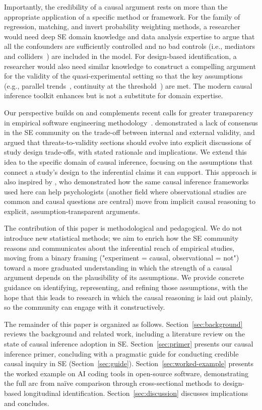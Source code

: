 Importantly, the credibility of a causal argument rests on more than the appropriate application of a specific method or framework. 
For the family of regression, matching, and invert probability weighting methods, a researcher would need deep SE domain knowledge and data analysis expertise to argue that all the confounders are sufficiently controlled and no bad controls (i.e., mediators and colliders~\cite{angrist2009mostly}) are included in the model.
For design-based identification, a researcher would also need similar knowledge to construct a compelling argument for the validity of the quasi-experimental setting so that the key assumptions (e.g., parallel trends~\cite{roth2023whats}, continuity at the threshold~\cite{cunningham2021causal}) are met.
The modern causal inference toolkit enhances but is not a substitute for domain expertise.

Our perspective builds on and complements recent calls for greater transparency in empirical software engineering methodology~\cite{DBLP:conf/icse/SiegmundSA15, DBLP:journals/tosem/RobillardAEGLNNSSS24}. 
\citet{DBLP:conf/icse/SiegmundSA15} demonstrated a lack of consensus in the SE community on the trade-off between internal and external validity, and \citet{DBLP:journals/tosem/RobillardAEGLNNSSS24} argued that threats-to-validity sections should evolve into explicit discussions of study design trade-offs, with stated rationale and implications. 
We extend this idea to the specific domain of causal inference, focusing on the assumptions that connect a study's design to the inferential claims it can support. 
This approach is also inspired by \citet{rohrer2018thinking}, who demonstrated how the same causal inference frameworks used here can help psychologists (another field where observational studies are common and causal questions are central) move from implicit causal reasoning to explicit, assumption-transparent arguments.

The contribution of this paper is methodological and pedagogical. 
We do not introduce new statistical methods; we aim to enrich how the SE community reasons and communicates about the inferential reach of empirical studies, moving from a binary framing ("experiment = causal, observational = not") toward a more graduated understanding in which the strength of a causal argument depends on the plausibility of its assumptions. 
We provide concrete guidance on identifying, representing, and refining those assumptions, with the hope that this leads to research in which the causal reasoning is laid out plainly, so the community can engage with it constructively.

The remainder of this paper is organized as follows.
Section~\ref{sec:background} reviews the background and related work, including a literature review on the state of causal inference adoption in SE.
Section~\ref{sec:primer} presents our causal inference primer, concluding with a pragmatic guide for conducting credible causal inquiry in SE (Section~\ref{sec:guide}).
Section~\ref{sec:worked-example} presents the worked example on AI coding tools in open-source software, demonstrating the full arc from na\"ive comparison through cross-sectional methods to design-based longitudinal identification.
Section~\ref{sec:discussion} discusses implications and concludes.
